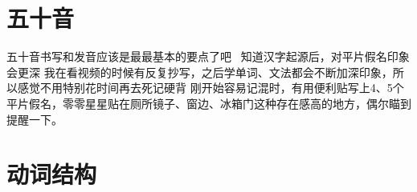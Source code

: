 \newpage
\setcounter{page}{1}

\fancyhf{} %
\fancyhead[LE,RO]{\leftmark}
\fancyfoot[C]{\thepage}

\section{五十音}
五十音书写和发音应该是最最基本的要点了吧~
知道汉字起源后，对平片假名印象会更深
我在看视频的时候有反复抄写，之后学单词、文法都会不断加深印象，所以感觉不用特别花时间再去死记硬背
刚开始容易记混时，有用便利贴写上4、5个平片假名，零零星星贴在厕所镜子、窗边、冰箱门这种存在感高的地方，偶尔瞄到提醒一下。

\newpage
\section{动词结构}

